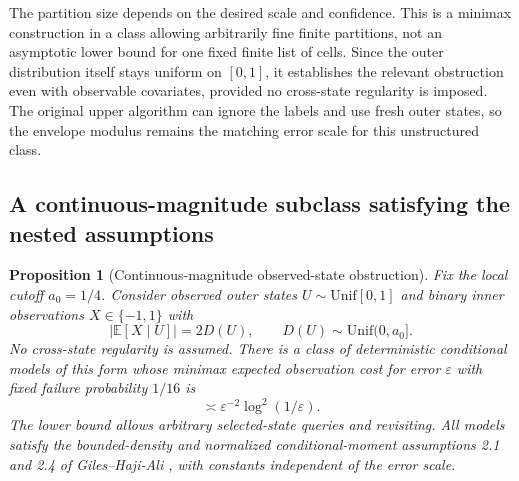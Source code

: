 \documentclass[11pt,a4paper]{article}
\newtheorem{proposition}[theorem]{Proposition}
\theoremstyle{definition}
\newcommand{\E}{\mathbb E}
\begin{document}
The partition size depends on the desired scale and confidence. This is
a minimax construction in a class allowing arbitrarily fine finite
partitions, not an asymptotic lower bound for one fixed finite list of
cells. Since the outer distribution itself stays uniform on $[0,1]$, it
establishes the relevant obstruction even with observable covariates,
provided no cross-state regularity is imposed. The original upper
algorithm can ignore the labels and use fresh outer states, so the
envelope modulus remains the matching error scale for this
unstructured class.

\subsection{A continuous-magnitude subclass satisfying the nested assumptions}
\begin{proposition}[Continuous-magnitude observed-state obstruction]\label{prop:continuous}
Fix the local cutoff $a_0=1/4$. Consider observed outer states $U\sim\mathrm{Unif}[0,1]$ and binary inner observations $X\in\{-1,1\}$ with
\[
|\E[X\mid U]|=2D(U),\qquad D(U)\sim\mathrm{Unif}(0,a_0].
\]
No cross-state regularity is assumed. There is a class of deterministic conditional models of this form whose minimax expected observation cost for error $\varepsilon$ with fixed failure probability $1/16$ is
\[
\asymp\varepsilon^{-2}\log^2(1/\varepsilon).
\]
The lower bound allows arbitrary selected-state queries and revisiting. All models satisfy the bounded-density and normalized conditional-moment assumptions 2.1 and 2.4 of Giles--Haji-Ali \cite{gileshajiali}, with constants independent of the error scale.
\end{proposition}
\end{document}

